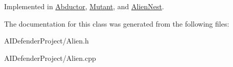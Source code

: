 Implemented in \hyperlink{class_abductor_a0a3080d1631319a1bf890cd0f08935a2}{Abductor}, \hyperlink{class_mutant_a38e6f65661b8f81e58f5e06b4d546457}{Mutant}, and \hyperlink{class_alien_nest_ac8d9fe5e35a8a049ae0be1b4f32bd403}{Alien\+Nest}.



The documentation for this class was generated from the following files\+:\begin{DoxyCompactItemize}
\item 
A\+I\+Defender\+Project/Alien.\+h\item 
A\+I\+Defender\+Project/Alien.\+cpp\end{DoxyCompactItemize}
